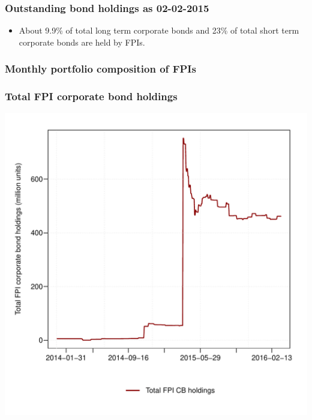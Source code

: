 \documentclass[9pt]{beamer}
\begin{document}
\begin{frame}
\frametitle{Outstanding bond holdings as 02-02-2015}

\begin{itemize}
  \item About 9.9\% of total long term corporate bonds and 23\% of total short
    term corporate bonds are held by FPIs.
\end{itemize}
\end{frame}


\begin{frame}
\frametitle{Monthly portfolio composition of FPIs}

\end{frame}



\begin{frame}
 \frametitle{Total FPI corporate bond holdings}
   \centering
   \includegraphics[width=0.8\paperwidth,height=0.5\paperwidth]{../GRAPHS/fpi_sum_all_cbs_all.pdf}
\end{frame}
\end{document}
